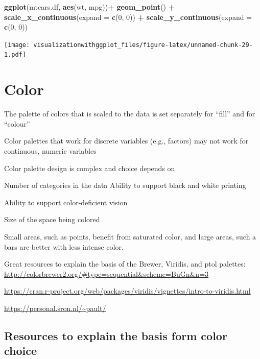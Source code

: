 \documentclass[]{krantz}
\makeatletter
\newenvironment{Shaded}{\begin{snugshade}}{\end{snugshade}}
\newcommand{\DataTypeTok}[1]{\textcolor[rgb]{0.13,0.29,0.53}{#1}}
\newcommand{\DecValTok}[1]{\textcolor[rgb]{0.00,0.00,0.81}{#1}}
\newcommand{\KeywordTok}[1]{\textcolor[rgb]{0.13,0.29,0.53}{\textbf{#1}}}
\newcommand{\NormalTok}[1]{#1}
\newcommand{\OperatorTok}[1]{\textcolor[rgb]{0.81,0.36,0.00}{\textbf{#1}}}
\newcommand{\StringTok}[1]{\textcolor[rgb]{0.31,0.60,0.02}{#1}}
\newenvironment{kframe}{%
\medskip{}
\setlength{\fboxsep}{.8em}
 \def\at@end@of@kframe{}%
 \ifinner\ifhmode%
  \def\at@end@of@kframe{\end{minipage}}%
  \begin{minipage}{\columnwidth}%
 \fi\fi%
 \def\FrameCommand##1{\hskip\@totalleftmargin \hskip-\fboxsep
 \colorbox{shadecolor}{##1}\hskip-\fboxsep
     \hskip-\linewidth \hskip-\@totalleftmargin \hskip\columnwidth}%
 \MakeFramed {\advance\hsize-\width
   \@totalleftmargin\z@ \linewidth\hsize
   \@setminipage}}%
 {\par\unskip\endMakeFramed%
 \at@end@of@kframe}
\renewenvironment{Shaded}{\begin{kframe}}{\end{kframe}}
\makeatother
\begin{document}
\begin{Shaded}
\begin{Highlighting}[]
\KeywordTok{ggplot}\NormalTok{(mtcars.df, }\KeywordTok{aes}\NormalTok{(wt, mpg))}\OperatorTok{+}
\StringTok{ }\KeywordTok{geom_point}\NormalTok{() }\OperatorTok{+}
\StringTok{  }\KeywordTok{scale_x_continuous}\NormalTok{(}\DataTypeTok{expand =} \KeywordTok{c}\NormalTok{(}\DecValTok{0}\NormalTok{, }\DecValTok{0}\NormalTok{)) }\OperatorTok{+}
\StringTok{  }\KeywordTok{scale_y_continuous}\NormalTok{(}\DataTypeTok{expand =} \KeywordTok{c}\NormalTok{(}\DecValTok{0}\NormalTok{, }\DecValTok{0}\NormalTok{)) }
\end{Highlighting}
\end{Shaded}

\texttt{[image: visualizationwithggplot\_files/figure-latex/unnamed-chunk-29-1.pdf]}

\hypertarget{color}{%
\section{Color}\label{color}}

The palette of colors that is scaled to the data is set separately for ``fill'' and for ``colour''

Color palettes that work for discrete variables (e.g., factors) may not work for continuous, numeric variables

Color palette design is complex and choice depends on

Number of categories in the data
Ability to support black and white printing

Ability to support color-deficient vision

Size of the space being colored

Small areas, such as points, benefit from saturated color, and large areas, such a bars are better with less intense color.

Great resources to explain the basis of the Brewer, Viridis, and ptol palettes: \url{http://colorbrewer2.org/\#type=sequential\&scheme=BuGn\&n=3}

\url{https://cran.r-project.org/web/packages/viridis/vignettes/intro-to-viridis.html}

\url{https://personal.sron.nl/~pault/}

\hypertarget{resources-to-explain-the-basis-form-color-choice}{%
\subsection{Resources to explain the basis form color choice}\label{resources-to-explain-the-basis-form-color-choice}}
\end{document}

